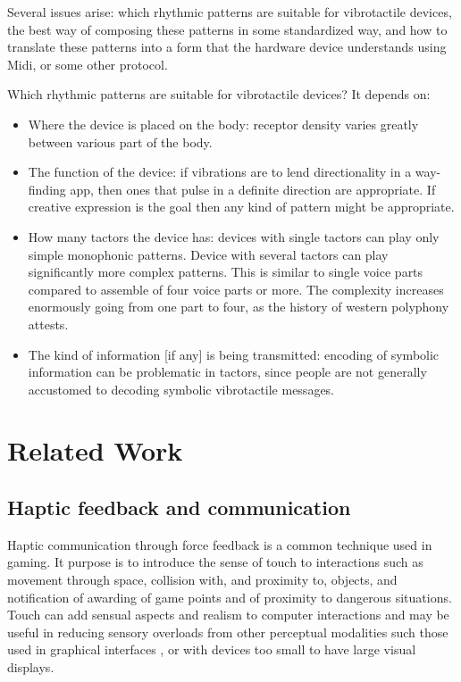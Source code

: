\documentclass[a4paper, twocolumn]{article}
\begin{document}
Several issues arise: which rhythmic patterns are suitable for vibrotactile devices, the best way of composing these patterns in some standardized way, and how to translate these patterns into a form that the hardware device understands using Midi, or some other protocol.

Which rhythmic patterns are suitable for vibrotactile devices? It depends on:
\begin{itemize}

\item Where the device is placed on the body: receptor density varies greatly between various part of the body. 

\item The function of the device: if vibrations are to lend directionality in a way-finding app, then ones that pulse in a definite direction are appropriate. If creative expression is the goal then any kind of pattern might be appropriate.

\item How many tactors the device has: devices with single tactors can play only simple monophonic patterns. Device with several tactors can play significantly more complex patterns. This is similar to single voice parts compared to assemble of four voice parts or more. The complexity increases enormously going from one part to four, as the history of western polyphony attests. 

\item The kind of information [if any] is being transmitted: encoding of symbolic information can be problematic in tactors, since people are not generally accustomed to decoding symbolic vibrotactile messages. 
\end{itemize}

\section{Related Work}

\subsection{Haptic feedback and communication}
Haptic communication through force feedback is a common technique used in gaming. It purpose is to introduce the sense of touch to interactions such as movement through space, collision with, and proximity to, objects, and notification of awarding of game points and of proximity to dangerous situations. Touch can add sensual aspects and realism to computer interactions and may be useful in reducing sensory overloads from other perceptual modalities such those used in graphical interfaces \cite{oakley2000putting}, or with devices too small to have large visual displays.
\end{document}
